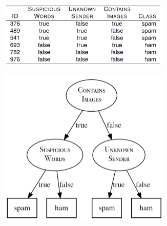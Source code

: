 \begin{figure}[h]
  \centering
  \begin{subfigure}{0.5\textwidth}
    \centering
    \includegraphics[width=0.9\textwidth]{assets/trees/basics/part_example_data.png}
  \end{subfigure}

  \hspace*{0.5cm}
  \begin{subfigure}{0.45\textwidth}
    \centering
    \includegraphics[width=0.9\textwidth]{assets/trees/basics/part_example_bad.png}
  \end{subfigure}
  \vspace*{10mm}
  \begin{subfigure}{0.45\textwidth}
    \centering

\end{subfigure}
\end{figure}
